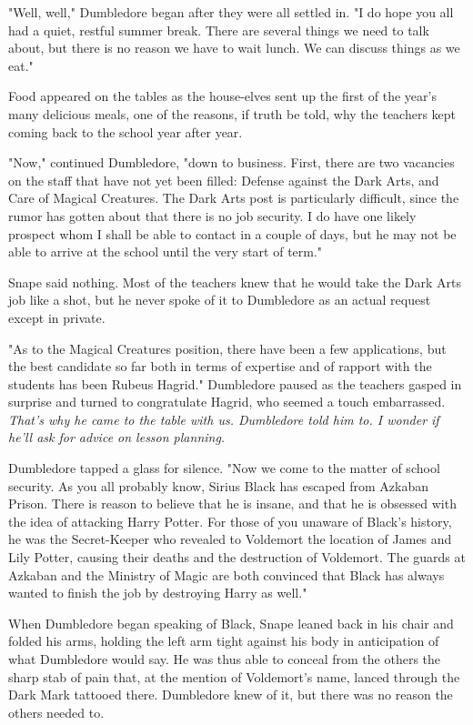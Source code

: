 "Well, well," Dumbledore began after they were all settled in. "I do hope you all had a quiet, restful summer break. There are several things we need to talk about, but there is no reason we have to wait lunch. We can discuss things as we eat."

Food appeared on the tables as the house-elves sent up the first of the year's many delicious meals, one of the reasons, if truth be told, why the teachers kept coming back to the school year after year.

"Now," continued Dumbledore, "down to business. First, there are two vacancies on the staff that have not yet been filled: Defense against the Dark Arts, and Care of Magical Creatures. The Dark Arts post is particularly difficult, since the rumor has gotten about that there is no job security. I do have one likely prospect whom I shall be able to contact in a couple of days, but he may not be able to arrive at the school until the very start of term."

Snape said nothing. Most of the teachers knew that he would take the Dark Arts job like a shot, but he never spoke of it to Dumbledore as an actual request except in private.

"As to the Magical Creatures position, there have been a few applications, but the best candidate so far both in terms of expertise and of rapport with the students has been Rubeus Hagrid." Dumbledore paused as the teachers gasped in surprise and turned to congratulate Hagrid, who seemed a touch embarrassed. \emph{That's why he came to the table with us. Dumbledore told him to. I wonder if he'll ask for advice on lesson planning.}

Dumbledore tapped a glass for silence. "Now we come to the matter of school security. As you all probably know, Sirius Black has escaped from Azkaban Prison. There is reason to believe that he is insane, and that he is obsessed with the idea of attacking Harry Potter. For those of you unaware of Black's history, he was the Secret-Keeper who revealed to Voldemort the location of James and Lily Potter, causing their deaths and the destruction of Voldemort. The guards at Azkaban and the Ministry of Magic are both convinced that Black has always wanted to finish the job by destroying Harry as well."

When Dumbledore began speaking of Black, Snape leaned back in his chair and folded his arms, holding the left arm tight against his body in anticipation of what Dumbledore would say. He was thus able to conceal from the others the sharp stab of pain that, at the mention of Voldemort's name, lanced through the Dark Mark tattooed there. Dumbledore knew of it, but there was no reason the others needed to.

